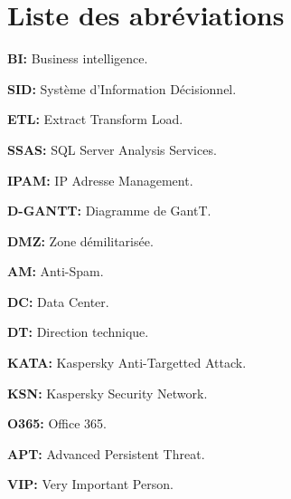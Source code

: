 \chapter*{Liste des abréviations}


\textbf{BI: }Business intelligence.

\textbf{SID:} Système d’Information Décisionnel.

\textbf{ETL: }Extract Transform Load.

\textbf{SSAS: } SQL Server Analysis Services.

\textbf{IPAM: }IP Adresse Management.

\textbf{D-GANTT: }Diagramme de GantT.

\textbf{DMZ: }Zone démilitarisée.

\textbf{AM: }Anti-Spam.

\textbf{DC: }Data Center.

\textbf{DT: }Direction technique.

\textbf{KATA: }Kaspersky Anti-Targetted Attack.

\textbf{KSN: }Kaspersky Security Network.

\textbf{O365: }Office 365.

\textbf{APT: }Advanced Persistent Threat.

\textbf{VIP: }Very Important Person.
